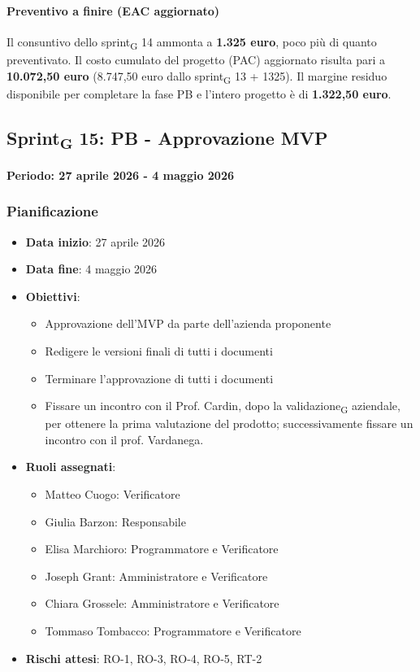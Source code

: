 \documentclass[11pt,a4paper]{article}
\newcommand{\gls}[1]{#1\textsubscript{G}}
\begin{document}
\paragraph{Preventivo a finire (EAC aggiornato)}
Il consuntivo dello \gls{sprint} 14 ammonta a \textbf{1.325 euro}, poco più di quanto preventivato.
Il costo cumulato del progetto (PAC) aggiornato risulta pari a \textbf{10.072,50 euro} (8.747,50 euro dallo \gls{sprint} 13 + 1325). 
Il margine residuo disponibile per completare la fase PB e l'intero progetto è di \textbf{1.322,50 euro}.

\newpage
\subsection{\gls{Sprint} 15: PB - Approvazione MVP}
{\textbf{Periodo: 27 aprile 2026 - 4 maggio 2026}\par}

\subsubsection{Pianificazione}
\begin{itemize}
    \item \textbf{Data inizio}: 27 aprile 2026
    \item \textbf{Data fine}: 4 maggio 2026
    \item \textbf{Obiettivi}:
    \begin{itemize}
        \item Approvazione dell'MVP da parte dell'azienda proponente
        \item Redigere le versioni finali di tutti i documenti
        \item Terminare l'approvazione di tutti i documenti
        \item Fissare un incontro con il Prof. Cardin, dopo la \gls{validazione} aziendale, per ottenere la prima valutazione del prodotto; successivamente fissare un incontro con il prof. Vardanega.
    \end{itemize}
    
    \item \textbf{Ruoli assegnati}:
    \begin{itemize}
        \item Matteo Cuogo: Verificatore
        \item Giulia Barzon: Responsabile
        \item Elisa Marchioro: Programmatore e Verificatore
        \item Joseph Grant: Amministratore e Verificatore
        \item Chiara Grossele: Amministratore e Verificatore
        \item Tommaso Tombacco: Programmatore e Verificatore
    \end{itemize}
    \item \textbf{Rischi attesi}: RO-1, RO-3, RO-4, RO-5, RT-2
\end{itemize}
\end{document}
